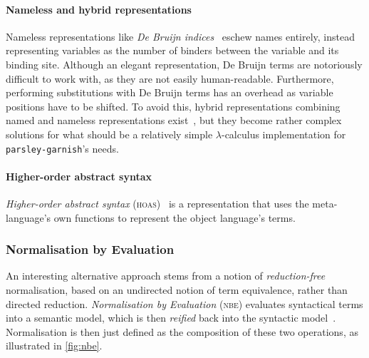 \documentclass[../../main.tex]{subfiles}
\begin{document}
\paragraph{Nameless and hybrid representations}
Nameless representations like \emph{De Bruijn indices}~\cite{debruijn_lambda_1972} eschew names entirely, instead representing variables as the number of binders between the variable and its binding site.
Although an elegant representation, De Bruijn terms are notoriously difficult to work with, as they are not easily human-readable.
Furthermore, performing substitutions with De Bruijn terms has an overhead as variable positions have to be shifted.
To avoid this, hybrid representations combining named and nameless representations exist~\cite{mcbride_imnotanumber_2004,chargueraud_locally_2012}, but they become rather complex solutions for what should be a relatively simple $\lambda$-calculus implementation for \texttt{parsley-garnish}'s needs.

\paragraph{Higher-order abstract syntax}
\emph{Higher-order abstract syntax} (\textsc{hoas})~\cite{pfenning_hoas_1988} is a representation that uses the meta-language's own functions to represent the object language's terms.


\subsubsection{Normalisation by Evaluation}
An interesting alternative approach stems from a notion of \emph{reduction-free} normalisation, based on an undirected notion of term equivalence, rather than directed reduction.
\emph{Normalisation by Evaluation} (\textsc{nbe}) evaluates syntactical terms into a semantic model, which is then \emph{reified} back into the syntactic model~\cite{filinski_nbe_2004}.
Normalisation is then just defined as the composition of these two operations, as illustrated in \cref{fig:nbe}.
\end{document}
